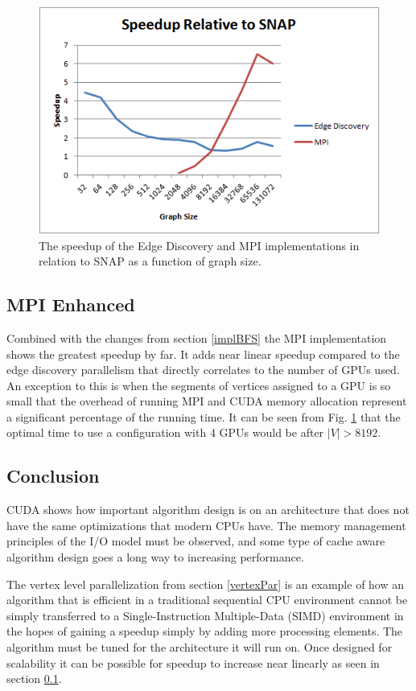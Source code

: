 \documentclass[10pt,twocolumn]{article}
\begin{document}
\begin{figure}[htbp]
\centering
\includegraphics[scale=.6]{speedup.png}
\caption{The speedup of the Edge Discovery and MPI implementations in relation to SNAP as a function of graph size.}
\label{fig:speedup}
\end{figure}

\subsection{MPI Enhanced}
\label{mpiResults}
Combined with the changes from section \ref{implBFS} the MPI implementation shows the greatest speedup by far. It adds near linear speedup compared to the edge discovery parallelism that directly correlates to the number of GPUs used. An exception to this is when the segments of vertices assigned to a GPU is so small that the overhead of running MPI and CUDA memory allocation represent a significant percentage of the running time. It can be seen from Fig. \ref{fig:speedup} that the optimal time to use a configuration with 4 GPUs would be after $|V| > 8192$.

\subsection{Conclusion}
CUDA shows how important algorithm design is on an architecture that does not have the same optimizations that modern CPUs have. The memory management principles of the I/O model must be observed, and some type of cache aware algorithm design goes a long way to increasing performance.

The vertex level parallelization from section \ref{vertexPar} is an example of how an algorithm that is efficient in a traditional sequential CPU environment cannot be simply transferred to a Single-Instruction Multiple-Data (SIMD) environment in the hopes of gaining a speedup simply by adding more processing elements. The algorithm must be tuned for the architecture it will run on. Once designed for scalability it can be possible for speedup to increase near linearly as seen in section \ref{mpiResults}.
\end{document}
